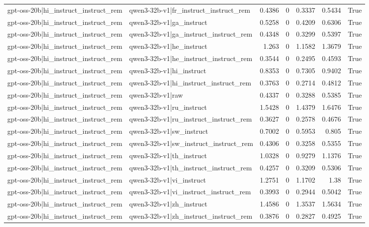 \begin{table}
\begin{tabular}{l l r r r r l}
gpt-oss-20b|hi_instruct_instruct_rem & qwen3-32b-v1|fr_instruct_instruct_rem & 0.4386 & 0 & 0.3337 & 0.5434 & True \\
gpt-oss-20b|hi_instruct_instruct_rem & qwen3-32b-v1|ga_instruct & 0.5258 & 0 & 0.4209 & 0.6306 & True \\
gpt-oss-20b|hi_instruct_instruct_rem & qwen3-32b-v1|ga_instruct_instruct_rem & 0.4348 & 0 & 0.3299 & 0.5397 & True \\
gpt-oss-20b|hi_instruct_instruct_rem & qwen3-32b-v1|he_instruct & 1.263 & 0 & 1.1582 & 1.3679 & True \\
gpt-oss-20b|hi_instruct_instruct_rem & qwen3-32b-v1|he_instruct_instruct_rem & 0.3544 & 0 & 0.2495 & 0.4593 & True \\
gpt-oss-20b|hi_instruct_instruct_rem & qwen3-32b-v1|hi_instruct & 0.8353 & 0 & 0.7305 & 0.9402 & True \\
gpt-oss-20b|hi_instruct_instruct_rem & qwen3-32b-v1|hi_instruct_instruct_rem & 0.3763 & 0 & 0.2714 & 0.4812 & True \\
gpt-oss-20b|hi_instruct_instruct_rem & qwen3-32b-v1|raw & 0.4337 & 0 & 0.3288 & 0.5385 & True \\
gpt-oss-20b|hi_instruct_instruct_rem & qwen3-32b-v1|ru_instruct & 1.5428 & 0 & 1.4379 & 1.6476 & True \\
gpt-oss-20b|hi_instruct_instruct_rem & qwen3-32b-v1|ru_instruct_instruct_rem & 0.3627 & 0 & 0.2578 & 0.4676 & True \\
gpt-oss-20b|hi_instruct_instruct_rem & qwen3-32b-v1|sw_instruct & 0.7002 & 0 & 0.5953 & 0.805 & True \\
gpt-oss-20b|hi_instruct_instruct_rem & qwen3-32b-v1|sw_instruct_instruct_rem & 0.4306 & 0 & 0.3258 & 0.5355 & True \\
gpt-oss-20b|hi_instruct_instruct_rem & qwen3-32b-v1|th_instruct & 1.0328 & 0 & 0.9279 & 1.1376 & True \\
gpt-oss-20b|hi_instruct_instruct_rem & qwen3-32b-v1|th_instruct_instruct_rem & 0.4257 & 0 & 0.3209 & 0.5306 & True \\
gpt-oss-20b|hi_instruct_instruct_rem & qwen3-32b-v1|vi_instruct & 1.2751 & 0 & 1.1702 & 1.38 & True \\
gpt-oss-20b|hi_instruct_instruct_rem & qwen3-32b-v1|vi_instruct_instruct_rem & 0.3993 & 0 & 0.2944 & 0.5042 & True \\
gpt-oss-20b|hi_instruct_instruct_rem & qwen3-32b-v1|zh_instruct & 1.4586 & 0 & 1.3537 & 1.5634 & True \\
gpt-oss-20b|hi_instruct_instruct_rem & qwen3-32b-v1|zh_instruct_instruct_rem & 0.3876 & 0 & 0.2827 & 0.4925 & True \\

\end{tabular}
\end{table}
